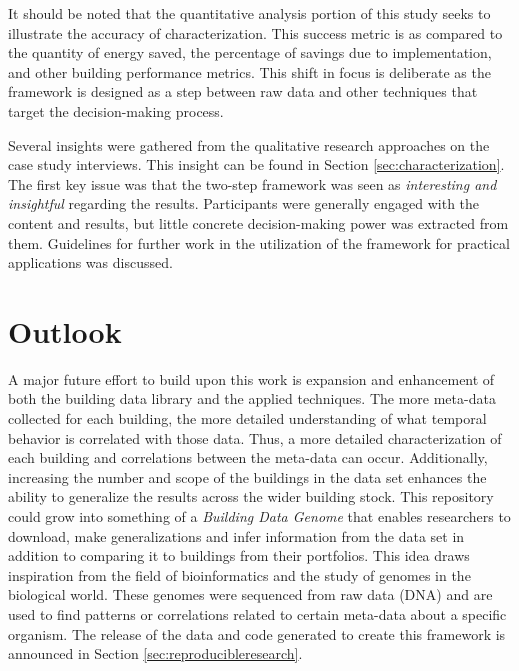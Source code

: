 It should be noted that the quantitative analysis portion of this study seeks to illustrate the accuracy of characterization. This success metric is as compared to the quantity of energy saved, the percentage of savings due to implementation, and other building performance metrics. This shift in focus is deliberate as the framework is designed as a step between raw data and other techniques that target the decision-making process. 

Several insights were gathered from the qualitative research approaches on the case study interviews. This insight can be found in Section \ref{sec:characterization}. The first key issue was that the two-step framework was seen as \emph{interesting and insightful} regarding the results. Participants were generally engaged with the content and results, but little concrete decision-making power was extracted from them. Guidelines for further work in the utilization of the framework for practical applications was discussed.


\section{Outlook}
\label{sec:futuresteps}
A major future effort to build upon this work is expansion and enhancement of both the building data library and the applied techniques. The more meta-data collected for each building, the more detailed understanding of what temporal behavior is correlated with those data. Thus, a more detailed characterization of each building and correlations between the meta-data can occur. Additionally, increasing the number and scope of the buildings in the data set enhances the ability to generalize the results across the wider building stock. This repository could grow into something of a \emph{Building Data Genome} that enables researchers to download, make generalizations and infer information from the data set in addition to comparing it to buildings from their portfolios. This idea draws inspiration from the field of bioinformatics and the study of genomes in the biological world. These genomes were sequenced from raw data (DNA) and are used to find patterns or correlations related to certain meta-data about a specific organism. The release of the data and code generated to create this framework is announced in Section \ref{sec:reproducibleresearch}.

